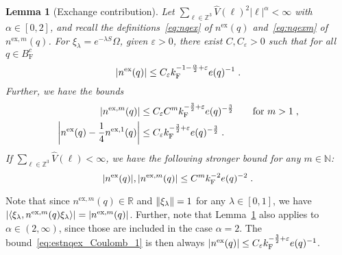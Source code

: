 \documentclass[12pt,a4paper]{article}
\numberwithin{equation}{section}
\newcommand{\1}{\mathbb{I}}
\newcommand{\ex}{\mathrm{ex}}
\newcommand{\F}{\mathrm{F}}
\newcommand{\Zstar}{\mathbb{Z}^3} %
\newcommand{\Z}{\mathbb{Z}}
\newcommand{\eva}[1]{\left\langle #1 \right\rangle}
\theoremstyle{plain}
\newtheorem{lemma}[theorem]{Lemma}
\theoremstyle{definition}
\theoremstyle{remark}
\theoremstyle{plain}
\theoremstyle{definition}
\theoremstyle{remark}
\begin{document}
\begin{lemma}[Exchange contribution] \label{lem:estnqex}
Let $ \sum_{\ell \in \Zstar} \hat{V}(\ell)^2 |\ell|^\alpha < \infty $ with $ \alpha \in [0,2] $, and recall the definitions~\eqref{eq:nqex} of $ n^{\ex}(q) $ and~\eqref{eq:nqexm} of $ n^{\ex,m}(q) $. For $\xi_\lambda = e^{-\lambda S} \Omega$, given $ \varepsilon > 0 $, there exist $ C, C_\varepsilon > 0 $ such that for all $ q \in B_{\F}^c $\todo{Also do $ q \in B_{\F} $.}
\begin{equation}
	\abs{n^{\ex}(q)}
	\leq C_\varepsilon k_{\F}^{-1 - \frac{\alpha}{2} + \varepsilon} e(q)^{-1} \;. \label{eq:estnqex_Coulomb_1}
\end{equation}
Further, we have the bounds
\begin{equation}
\begin{aligned}
	\abs{n^{\ex,m}(q)}
	&\leq C_\varepsilon C^m k_{\F}^{-\frac 32 + \varepsilon} e(q)^{-\frac 32} \qquad \textnormal{for } m > 1 \;, \\
	\abs{n^{\ex}(q) - \frac 14 n^{\ex,1}(q)}
	&\leq C_\varepsilon k_{\F}^{-\frac 32 + \varepsilon} e(q)^{-\frac 32} \;. \label{eq:estnqex_Coulomb}
\end{aligned}
\end{equation}
If $ \sum_{\ell \in \Zstar} \hat{V}(\ell) < \infty $, we have the following stronger bound for any $ m \in \mathbb{N} $:
\begin{equation}
	\abs{n^{\ex}(q)},
	\abs{n^{\ex,m}(q)}
	\leq C^m k_{\F}^{-2} e(q)^{-2} \;. \label{eq:estnqex}
\end{equation}
\end{lemma}

Note that since $ n^{\ex,m}(q) \in \mathbb{R} $ and $ \norm{\xi_\lambda} = 1 $ for any $ \lambda \in [0,1] $, we have $ \abs{\eva{\xi_\lambda, n^{\ex,m}(q) \xi_\lambda }} = |n^{\ex,m}(q)| $. Further, note that Lemma~\ref{lem:estnqex} also applies to $ \alpha \in (2,\infty) $, since those are included in the case $ \alpha = 2 $. The bound~\eqref{eq:estnqex_Coulomb_1} is then always $ \abs{n^{\ex}(q)} \leq C_\varepsilon k_{\F}^{-\frac 32 + \varepsilon} e(q)^{-1} $.
\end{document}
